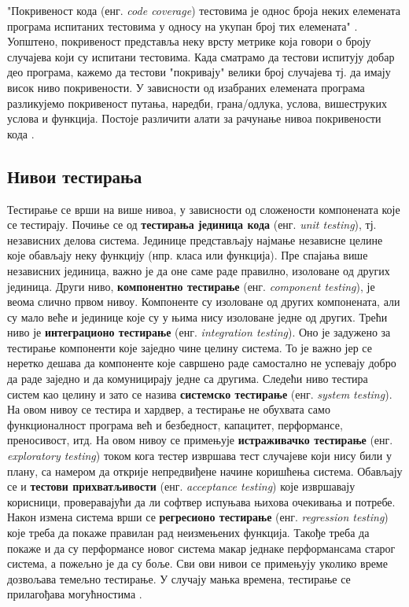 \documentclass[12pt,oneside]{memoir}
\begin{document}
"Покривеност кода (енг. \textit{code coverage}) тестовима је однос броја неких елемената програма испитаних тестовима у односу на укупан број тих елемената" \cite{testMilena}. Уопштено, покривеност представља неку врсту метрике која говори о броју случајева који су испитани тестовима. Када сматрамо да тестови испитују добар део програма, кажемо да тестови "покривају" велики број случајева тј. да имају висок ниво покривености. У зависности од изабраних елемената програма разликујемо покривеност путања, наредби, грана/одлука, услова, вишеструких услова и функција. Постоје различити алати за рачунање нивоа покривености кода \cite{testMilena}.
\subsection{Нивои тестирања}
\label{subsec:nivoiTest}

\par Тестирање се врши на више нивоа, у зависности од сложености компонената које се тестирају. Почиње се од \textbf{тестирања јединица кода} (енг. \textit{unit testing}), тј. независних делова система. Јединице представљају најмање независне целине које обављају неку функцију (нпр. класа или функција). Пре спајања више независних јединица, важно је да оне саме раде правилно, изоловане од других јединица. Други ниво, \textbf{компонентно тестирање} (енг. \textit{component testing}), је веома слично првом нивоу. Компоненте су изоловане од других компонената, али су мало веће и јединице које су у њима нису изоловане једне од других. Трећи ниво је \textbf{интеграционо тестирање} (енг. \textit{integration testing}). Оно је задужено за тестирање компоненти које заједно чине целину система. То је важно јер се неретко дешава да компоненте које савршено раде самостално не успевају добро да раде заједно и да комуницирају једне са другима. Следећи ниво тестира систем као целину и зато се назива \textbf{системско тестирање} (енг. \textit{system testing}). На овом нивоу се тестира и хардвер, а тестирање не обухвата само функционалност програма већ и безбедност, капацитет, перформансе, преносивост, итд. На овом нивоу се примењује \textbf{истраживачко тестирање} (енг. \textit{exploratory testing}) током кога тестер извршава тест случајеве који нису били у плану, са намером да открије непредвиђене начине коришћења система. Обављају се и \textbf{тестови прихватљивости} (енг. \textit{acceptance testing}) које извршавају корисници, проверавајући да ли софтвер испуњава њихова очекивања и потребе. Након измена система врши се \textbf{регресионо тестирање} (енг. \textit{regression testing}) које треба да покаже правилан рад неизмењених  функција. Такође треба да покаже и да су перформансе новог система макар једнаке перформансама старог система, а пожељно је да су боље. Сви ови нивои се примењују уколико време дозвољава темељно тестирање. У случају мањка времена, тестирање се прилагођава могућностима \cite{guideTestDesign, testMilena}.
\end{document}
